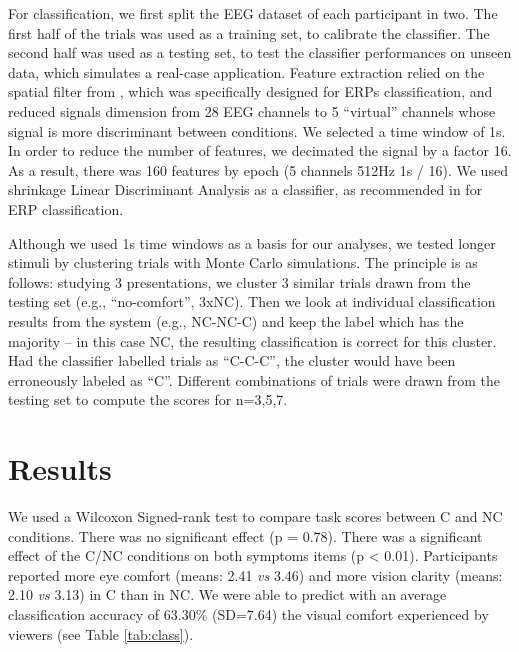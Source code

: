 \documentclass{template/llncs}
\begin{document}
For classification, we first split the EEG dataset of each participant in two. The first half of the trials was used as a training set, to calibrate the classifier. The second half was used as a testing set, to test the classifier performances on unseen data, which simulates a real-case application. Feature extraction relied on the spatial filter from \cite{Hoffmann2006}, which was specifically designed for ERPs classification, and reduced signals dimension from 28 EEG channels to 5 ``virtual'' channels whose signal is more discriminant between conditions. We selected a time window of 1s.
In order to reduce the number of features, we decimated the signal by a factor 16. As a result, there was 160 features by epoch (5 channels  512Hz  1s / 16). We used shrinkage Linear Discriminant Analysis as a classifier, as recommended in \cite{Blankertz2011} for ERP classification. 




Although we used 1s time windows as a basis for our analyses, we tested longer stimuli by clustering trials with Monte Carlo simulations.
The principle is as follows: studying 3 presentations, we cluster 3 similar trials drawn from the testing set (e.g., ``no-comfort'', 3xNC). Then we look at individual classification results from the system (e.g., NC-NC-C) and keep the label which has the majority -- in this case NC, the resulting classification is correct for this cluster. Had the classifier labelled trials as ``C-C-C'',
the cluster would have been erroneously labeled as ``C''. Different combinations of trials were drawn from the testing set to compute the scores for n=3,5,7. 


\section{Results}\label{results}



We used a Wilcoxon Signed-rank test to compare task scores between C and NC conditions. There was no significant effect (p = 0.78).
There was a significant effect of the C/NC conditions on both symptoms items (p \textless{} 0.01). Participants reported more eye comfort (means: 2.41 \emph{vs} 3.46) and more vision clarity (means: 2.10 \emph{vs} 3.13) in C than in NC. We were able to predict with an average classification accuracy of 63.30\% (SD=7.64) the visual comfort experienced by viewers (see Table \ref{tab:class}).
\end{document}
